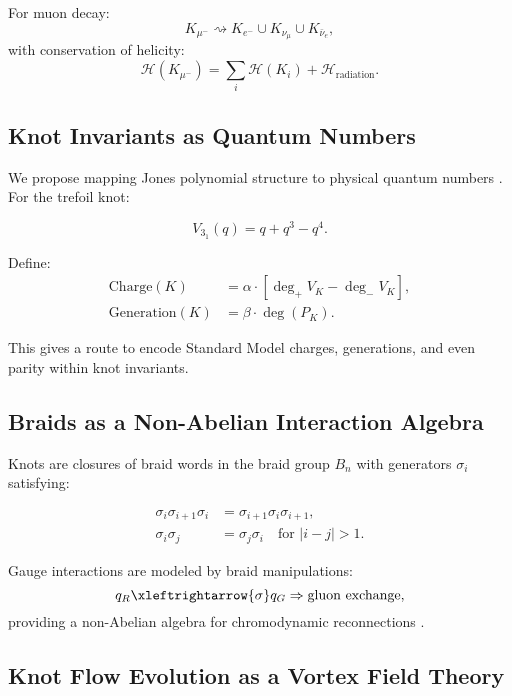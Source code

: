 For muon decay:
\begin{equation}
    K_{\mu^-} \rightsquigarrow K_{e^-} \cup K_{\nu_\mu} \cup K_{\bar{\nu}_e},
\end{equation}
with conservation of helicity:
\begin{equation}
    \mathcal{H}(K_{\mu^-}) = \sum_i \mathcal{H}(K_i) + \mathcal{H}_\text{radiation}.
\end{equation}

\subsection{Knot Invariants as Quantum Numbers}

We propose mapping Jones polynomial structure to physical quantum numbers \cite{kauffman2001knots}. For the trefoil knot:

\begin{equation}
    V_{3_1}(q) = q + q^3 - q^4.
\end{equation}

Define:
\begin{align}
    \text{Charge}(K) &= \alpha \cdot \left[ \deg_+ V_K - \deg_- V_K \right], \\
    \text{Generation}(K) &= \beta \cdot \deg(P_K).
\end{align}

This gives a route to encode Standard Model charges, generations, and even parity within knot invariants.

\subsection{Braids as a Non-Abelian Interaction Algebra}

Knots are closures of braid words in the braid group $B_n$ with generators $\sigma_i$ satisfying:

\begin{align}
    \sigma_i \sigma_{i+1} \sigma_i &= \sigma_{i+1} \sigma_i \sigma_{i+1}, \\
    \sigma_i \sigma_j &= \sigma_j \sigma_i \quad \text{for } |i-j| > 1.
\end{align}

Gauge interactions are modeled by braid manipulations:
\[
    q_R \xleftrightarrow{\sigma} q_G \Rightarrow \text{gluon exchange},
\]
providing a non-Abelian algebra for chromodynamic reconnections \cite{birman1975braids}.

\subsection{Knot Flow Evolution as a Vortex Field Theory}

